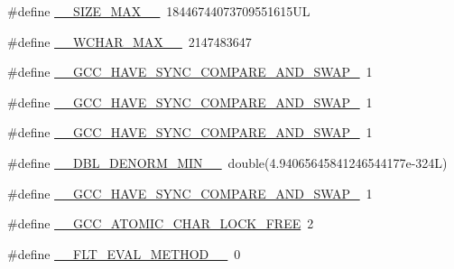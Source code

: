 \begin{DoxyCompactItemize}
\item 
\#define \hyperlink{build-analizer__host-_desktop___qt__5__9__0___g_c_c__64bit-debug_2moc__predefs_8h_a66fbb70a69c9f66830f95a20e46091a6}{\+\_\+\+\_\+\+S\+I\+Z\+E\+\_\+\+M\+A\+X\+\_\+\+\_\+}~18446744073709551615\+U\+L
\item 
\#define \hyperlink{build-analizer__host-_desktop___qt__5__9__0___g_c_c__64bit-debug_2moc__predefs_8h_a65ac8cd0434319a3a31dc031409c218a}{\+\_\+\+\_\+\+W\+C\+H\+A\+R\+\_\+\+M\+A\+X\+\_\+\+\_\+}~2147483647
\item 
\#define \hyperlink{build-analizer__host-_desktop___qt__5__9__0___g_c_c__64bit-debug_2moc__predefs_8h_a33433eca9e18e14156165252746f4d44}{\+\_\+\+\_\+\+G\+C\+C\+\_\+\+H\+A\+V\+E\+\_\+\+S\+Y\+N\+C\+\_\+\+C\+O\+M\+P\+A\+R\+E\+\_\+\+A\+N\+D\+\_\+\+S\+W\+A\+P\+\_}~1
\item 
\#define \hyperlink{build-analizer__host-_desktop___qt__5__9__0___g_c_c__64bit-debug_2moc__predefs_8h_a7237ce09defceeebe3ba0afc528275ac}{\+\_\+\+\_\+\+G\+C\+C\+\_\+\+H\+A\+V\+E\+\_\+\+S\+Y\+N\+C\+\_\+\+C\+O\+M\+P\+A\+R\+E\+\_\+\+A\+N\+D\+\_\+\+S\+W\+A\+P\+\_}~1
\item 
\#define \hyperlink{build-analizer__host-_desktop___qt__5__9__0___g_c_c__64bit-debug_2moc__predefs_8h_a6310789290c9c5717826b56443ce69ec}{\+\_\+\+\_\+\+G\+C\+C\+\_\+\+H\+A\+V\+E\+\_\+\+S\+Y\+N\+C\+\_\+\+C\+O\+M\+P\+A\+R\+E\+\_\+\+A\+N\+D\+\_\+\+S\+W\+A\+P\+\_}~1
\item 
\#define \hyperlink{build-analizer__host-_desktop___qt__5__9__0___g_c_c__64bit-debug_2moc__predefs_8h_aca2a716d3e84ccffe000390bb2e2fb38}{\+\_\+\+\_\+\+D\+B\+L\+\_\+\+D\+E\+N\+O\+R\+M\+\_\+\+M\+I\+N\+\_\+\+\_\+}~double(4.\+94065645841246544177e-\/324\+L)
\item 
\#define \hyperlink{build-analizer__host-_desktop___qt__5__9__0___g_c_c__64bit-debug_2moc__predefs_8h_a86bb5059d696b19082c1aff4ae93a87a}{\+\_\+\+\_\+\+G\+C\+C\+\_\+\+H\+A\+V\+E\+\_\+\+S\+Y\+N\+C\+\_\+\+C\+O\+M\+P\+A\+R\+E\+\_\+\+A\+N\+D\+\_\+\+S\+W\+A\+P\+\_}~1
\item 
\#define \hyperlink{build-analizer__host-_desktop___qt__5__9__0___g_c_c__64bit-debug_2moc__predefs_8h_a403ff8d656461ff5a083fb47f73c7da3}{\+\_\+\+\_\+\+G\+C\+C\+\_\+\+A\+T\+O\+M\+I\+C\+\_\+\+C\+H\+A\+R\+\_\+\+L\+O\+C\+K\+\_\+\+F\+R\+E\+E}~2
\item 
\#define \hyperlink{build-analizer__host-_desktop___qt__5__9__0___g_c_c__64bit-debug_2moc__predefs_8h_a737828904768e0ab49acbdb3371d8445}{\+\_\+\+\_\+\+F\+L\+T\+\_\+\+E\+V\+A\+L\+\_\+\+M\+E\+T\+H\+O\+D\+\_\+\+\_\+}~0

\end{DoxyCompactItemize}
